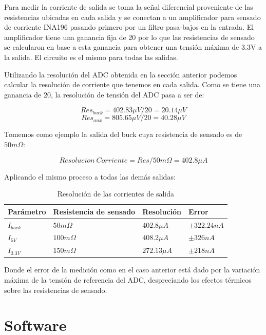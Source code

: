 \documentclass[12pt]{report}
\begin{document}
Para medir la corriente de salida se toma la señal diferencial proveniente de las resistencias ubicadas en cada salida y se conectan a un amplificador para sensado de corriente INA196 pasando primero por un filtro pasa-bajos en la entrada. El amplificador tiene una ganancia fija de 20 por lo que las resistencias de sensado se calcularon en base a esta ganancia para obtener una tensión máxima de 3.3V a la salida. El circuito es el mismo para todas las salidas.

Utilizando la resolución del ADC obtenida en la sección anterior podemos calcular la resolución de corriente que tenemos en cada salida. Como se tiene una ganancia de 20, la resolución de tensión del ADC pasa a ser de:

\begin{equation}
	Res_{buck} = 402.83 \mu V / 20 = 20.14\mu V
\end{equation}
\begin{equation}
	Res_{aux} = 805.65 \mu V / 20 = 40.28 \mu V
\end{equation}

Tomemos como ejemplo la salida del buck cuya resistencia de sensado es de $50m\Omega$:

\begin{equation}
	Resolucion \ Corriente = Res / 50m\Omega = 402.8 \mu A
\end{equation}

Aplicando el mismo proceso a todas las demás salidas:

\begin{table}[H]
	\centering
	\begin{tabular}{M{2cm}M{5cm}M{3cm}M{3cm}} \toprule
		Parámetro & Resistencia de sensado & Resolución & Error 
		\\ \midrule
		$I_{buck}$ & $50m\Omega$ & $402.8 \mu A$ & $\pm 322.24nA$ \\
		$I_{5V}$ & $100m\Omega$ & $408.2 \mu A$ & $\pm 326nA$ \\
		$I_{3.3V}$ & $150m\Omega$ & $272.13 \mu A$ & $\pm 218nA$ \\
		\bottomrule
	\end{tabular}
	\caption{Resolución de las corrientes de salida}
\end{table}

Donde el error de la medición como en el caso anterior está dado por la variación máxima de la tensión de referencia del ADC, despreciando los efectos térmicos sobre las resistencias de sensado.

\chapter{Software}
\end{document}
